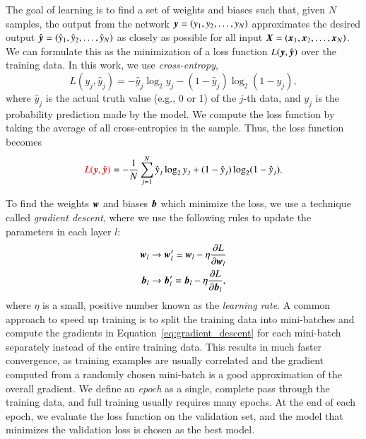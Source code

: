 \documentclass[fleqn,usenatbib]{mnras}
\newcommand{\eg}{{e.g., }}
\newcommand{\changed}[1]{\textcolor{red}{#1}}
\begin{document}
The goal of learning is to find a set of weights and biases such that,
given $N$ samples, the output from the network
$\bmath{y}=\left(y_1, y_2, \dots, y_N \right)$
approximates the desired output
$\hat{\bmath{y}}=\left(\hat{y}_1, \hat{y}_2, \dots, \hat{y}_N \right)$
as closely as possible for all input
$\bmath{X}=\left(\bmath{x}_1,\bmath{x}_2,\dots,\bmath{x}_N\right)$.
We can formulate this as the minimization of a loss function
$L(\bmath{y},\hat{\bmath{y}})$
over the training data.
In this work, we use \textit{cross-entropy},
\begin{equation}
  L(y_j, \hat{y}_j) = -\hat{y}_j \log_2 y_j - (1 - \hat{y}_j) \log_2(1 - y_j),
  \label{eq:cross_entropy}
\end{equation}
where $\hat{y}_j$ is the actual truth value (\eg 0 or 1) of the $j$-th data, and
$y_j$ is the probability prediction made by the model.
We compute the loss function by taking the average of all cross-entropies in the sample.
Thus, the loss function becomes
\begin{equation}
\changed{
  L(\bmath{y}, \hat{\bmath{y}})
}
= - \frac{1}{N} \sum_{j=1}^{N} \hat{y}_j  \log_2 y_j
    + (1 - \hat{y}_j)  \log_2 (1 - \hat y_j).
  \label{eq:cross_entropy_all}
\end{equation}

To find the weights $\bmath{w}$ and biases $\bmath{b}$ which minimize the loss,
we use a technique called \textit{gradient descent},
where we use the following rules to update the parameters in each layer $l$:
\begin{align}
  \bmath{w}_l &\rightarrow
  \bmath{w}_l^{\prime}
  = \bmath{w}_l - \eta \frac{\partial L}{\partial \bmath{w}_l} \nonumber \\
  \bmath{b}_l &\rightarrow
  \bmath{b}_l^{\prime}
  = \bmath{b}_l - \eta \frac{\partial L}{\partial \bmath{b}_l},
  \label{eq:gradient_descent}
\end{align}
where $\eta$ is a small, positive number known as the \textit{learning rate}.
A common approach to speed up training is to split the training data
into mini-batches and compute the gradients in
Equation~\ref{eq:gradient_descent} for each mini-batch separately instead of
the entire training data.
This results in much faster convergence, as training examples are usually correlated
and the gradient computed from a randomly chosen mini-batch is a good approximation
of the overall gradient.
We define an \textit{epoch} as a single, complete pass through the training data,
and full training usually requires many epochs.
At the end of each epoch, we evaluate the loss function on the validation set,
and the model that minimizes the validation loss is chosen as the best model.
\end{document}
